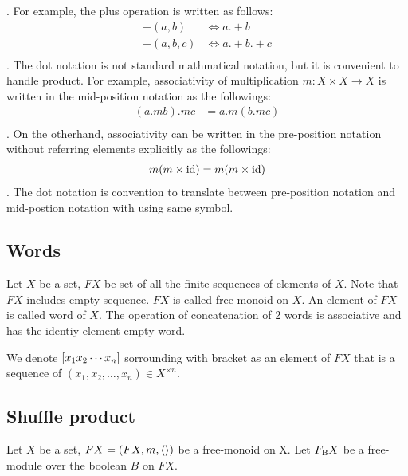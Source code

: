 . For example, the plus operation is written as follows:
\begin{equation}\begin{split}
	+(a, b) &\Leftrightarrow a .+ b \\
	+(a, b, c) &\Leftrightarrow a .+ b .+ c \\
\end{split}\end{equation}
. The dot notation is not standard mathmatical notation, 
but it is convenient to handle product.
For example, associativity of multiplication $m:X\times X\to X$ is written 
in the mid-position notation as the followings:
\begin{equation}\begin{split}
	(a.m b).m c &= a.m (b.m c) \\
\end{split}\end{equation}
. On the otherhand, associativity can be written in the pre-position notation 
without referring elements explicitly as the followings:
\begin{equation}\begin{split}
	m(m\times {\operatorname{id}}) &= m(m\times {\operatorname{id}}) \\
\end{split}\end{equation}
. The dot notation is convention to translate between pre-position notation
and mid-postion notation with using same symbol.

\subsection{Words}
\begin{definition}
Let $X$ be a set, $FX$ be set of all the finite sequences of elements of $X$.
Note that $FX$ includes empty sequence. $FX$ is called free-monoid on $X$.
An element of $FX$ is called word of $X$.
The operation of concatenation of 2 words is associative and has the identiy
element empty-word.
\end{definition}

We denote $\left[{x_1x_2\cdots x_n}\right]$ sorrounding with bracket as an element of
$FX$ that is a sequence of $(x_1,x_2,\dots,x_n)\in X^{\times n}$.

\subsection{Shuffle product}
Let $X$ be a set, $FX=(FX, m, \mathinner{\langle{}\rangle})$ be a free-monoid on X.
Let $F_{\operatorname{B}}X$ be a free-module over the boolean $B$ on $FX$.

